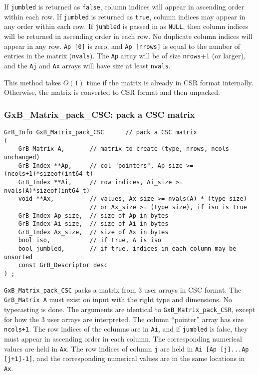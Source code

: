 \documentclass[12pt]{article}
\begin{document}
{If \verb'jumbled' is returned as \verb'false', column indices will appear in
ascending order within each row.  If \verb'jumbled' is returned as \verb'true',
column indices may appear in any order within each row.  If \verb'jumbled' is
passed in as \verb'NULL', then column indices will be returned in ascending
order in each row.  No duplicate column indices will appear in any row.
\verb'Ap [0]' is zero, and \verb'Ap [nrows]' is equal to the number of entries
in the matrix (\verb'nvals').  The \verb'Ap' array will be of size
\verb'nrows'+1 (or larger), and the \verb'Aj' and \verb'Ax' arrays will have
size at least \verb'nvals'.

This method takes $O(1)$ time if the matrix is already in CSR format
internally.  Otherwise, the matrix is converted to CSR format and then
unpacked.

\newpage
\subsubsection{{\sf GxB\_Matrix\_pack\_CSC:} pack a CSC matrix}
\label{matrix_pack_csc}

\begin{mdframed}[userdefinedwidth=6in]
{\footnotesize
\begin{verbatim}
GrB_Info GxB_Matrix_pack_CSC      // pack a CSC matrix
(
    GrB_Matrix A,       // matrix to create (type, nrows, ncols unchanged)
    GrB_Index **Ap,     // col "pointers", Ap_size >= (ncols+1)*sizeof(int64_t)
    GrB_Index **Ai,     // row indices, Ai_size >= nvals(A)*sizeof(int64_t)
    void **Ax,          // values, Ax_size >= nvals(A) * (type size)
                        // or Ax_size >= (type size), if iso is true
    GrB_Index Ap_size,  // size of Ap in bytes
    GrB_Index Ai_size,  // size of Ai in bytes
    GrB_Index Ax_size,  // size of Ax in bytes
    bool iso,           // if true, A is iso
    bool jumbled,       // if true, indices in each column may be unsorted
    const GrB_Descriptor desc
) ;
\end{verbatim}
} \end{mdframed}

\verb'GxB_Matrix_pack_CSC' packs a matrix from 3 user arrays in CSC format.
The \verb'GrB_Matrix A' must exist on input with the right type and dimensions.
No typecasting is done.
The arguments are identical to
\verb'GxB_Matrix_pack_CSR', except for how the 3 user arrays are
interpreted.  The column ``pointer'' array has size \verb'ncols+1'.  The row
indices of the columns are in \verb'Ai', and if \verb'jumbled' is false,
they must appear in ascending order in
each column.  The corresponding numerical values are held in \verb'Ax'.  The
row indices of column \verb'j' are held in \verb'Ai [Ap [j]...Ap [j+1]-1]',
and the corresponding numerical values are in the same locations in \verb'Ax'.

}
\end{document}
